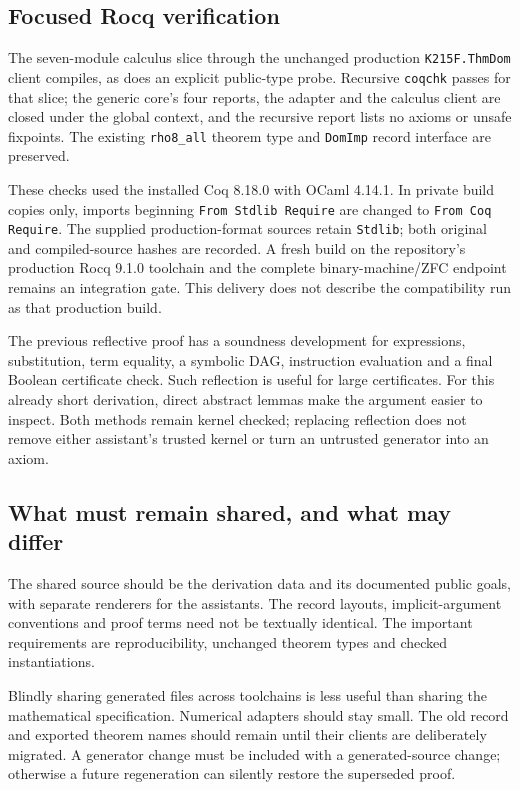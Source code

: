 \documentclass[11pt]{article}
\newcommand{\code}[1]{\texttt{\small #1}}
\begin{document}
\subsection{Focused Rocq verification}

The seven-module calculus slice through the unchanged production \code{K215F.ThmDom} client compiles, as does an explicit public-type probe. Recursive \code{coqchk} passes for that slice; the generic core's four reports, the adapter and the calculus client are closed under the global context, and the recursive report lists no axioms or unsafe fixpoints. The existing \code{rho8\_all} theorem type and \code{DomImp} record interface are preserved.

These checks used the installed Coq 8.18.0 with OCaml 4.14.1. In private build copies only, imports beginning \code{From Stdlib Require} are changed to \code{From Coq Require}. The supplied production-format sources retain \code{Stdlib}; both original and compiled-source hashes are recorded. A fresh build on the repository's production Rocq 9.1.0 toolchain and the complete binary-machine/ZFC endpoint remains an integration gate. This delivery does not describe the compatibility run as that production build.

The previous reflective proof has a soundness development for expressions, substitution, term equality, a symbolic DAG, instruction evaluation and a final Boolean certificate check. Such reflection is useful for large certificates. For this already short derivation, direct abstract lemmas make the argument easier to inspect. Both methods remain kernel checked; replacing reflection does not remove either assistant's trusted kernel or turn an untrusted generator into an axiom.

\subsection{What must remain shared, and what may differ}

The shared source should be the derivation data and its documented public goals, with separate renderers for the assistants. The record layouts, implicit-argument conventions and proof terms need not be textually identical. The important requirements are reproducibility, unchanged theorem types and checked instantiations.

Blindly sharing generated files across toolchains is less useful than sharing the mathematical specification. Numerical adapters should stay small. The old record and exported theorem names should remain until their clients are deliberately migrated. A generator change must be included with a generated-source change; otherwise a future regeneration can silently restore the superseded proof.
\end{document}
